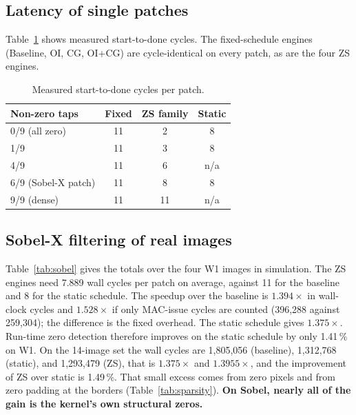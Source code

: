\documentclass[11pt,journal,draftclsnofoot,onecolumn]{IEEEtran}
\begin{document}
\subsection{Latency of single patches}
Table~\ref{tab:corner} shows measured start-to-done cycles. The fixed-schedule engines
(Baseline, OI, CG, OI+CG) are cycle-identical on every patch, as are the four ZS engines.

\begin{table}[t]
\centering
\caption{Measured start-to-done cycles per patch.}
\label{tab:corner}
\small
\setlength{\tabcolsep}{10pt}
\begin{tabular}{lccc}
\toprule
\textbf{Non-zero taps} & \textbf{Fixed} & \textbf{ZS family} & \textbf{Static}\\
\midrule
0/9 (all zero)           & 11 &  2 &  8\\
1/9                      & 11 &  3 &  8\\
4/9                      & 11 &  6 & n/a\\
6/9 (Sobel-X patch)      & 11 &  8 &  8\\
9/9 (dense)              & 11 & 11 & n/a\\
\bottomrule
\end{tabular}
\end{table}

\subsection{Sobel-X filtering of real images}\label{sec:r-sobel}
Table~\ref{tab:sobel} gives the totals over the four W1 images in simulation. The ZS engines need 7.889
wall cycles per patch on average, against 11 for the baseline and 8 for the static
schedule. The speedup over the baseline is $1.394\times$ in wall-clock cycles and
$1.528\times$ if only MAC-issue cycles are counted (396{,}288 against 259{,}304); the
difference is the fixed overhead. The static schedule gives $1.375\times$. Run-time zero
detection therefore improves on the static schedule by only 1.41\,\% on W1. On the
14-image set the wall cycles are 1{,}805{,}056 (baseline), 1{,}312{,}768 (static), and
1{,}293{,}479 (ZS), that is $1.375\times$ and $1.3955\times$, and the improvement of ZS
over static is 1.49\,\%. That small excess comes from zero pixels and from zero padding at
the borders (Table~\ref{tab:sparsity}). \textbf{On Sobel, nearly all of the gain is the
kernel's own structural zeros.}
\end{document}
